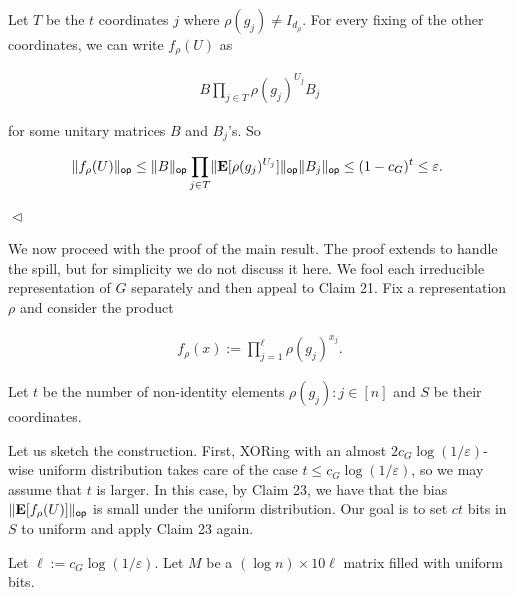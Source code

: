 \documentclass[10pt,a4paper]{article}
\begin{document}
Let $T$ be the $t$ coordinates $j$ where $\rho(g_{j})\neq I_{d_{\rho}}$.
For every fixing of the other coordinates, we can write $f_{\rho}(U)$ as\par


\[\begin{gathered}
B\prod_{j\in T}\rho(g_{j})^{U_{j}}B_{j}
\end{gathered}\]


for some unitary matrices $B$ and $B_{j}$’s.
So\par


\[\begin{gathered}
\lVert f_{\rho}(U)\rVert_{\mathsf{op}}\leq\lVert B\rVert_{\mathsf{op}}\prod_{j\in T}\lVert\mathop{\bf E\/}[\rho(g_{j})^{U_{j}}]\rVert_{\mathsf{op}}\lVert B_{j}\rVert_{\mathsf{op}}\leq(1-c_{G})^{t}\leq\varepsilon.\
\end{gathered}\]


$\vartriangleleft$\par




We now proceed with the proof of the main result. The proof extends to handle the spill, but for simplicity we do not discuss it here. We fool each irreducible representation of $G$ separately and then appeal to Claim 21.
Fix a representation $\rho$ and consider the product\par


\[\begin{gathered}
f_{\rho}(x):=\prod_{j=1}^{\ell}\rho(g_{j})^{x_{j}}.
\end{gathered}\]


Let $t$ be the number of non-identity elements $\rho(g_{j}):j\in[n]$ and $S$ be their coordinates.\par




Let us sketch the construction.
First, XORing with an almost $2c_{G}\log(1/\varepsilon)$-wise uniform distribution takes care of the case $t\leq c_{G}\log(1/\varepsilon)$, so we may assume that $t$ is larger.
In this case, by Claim 23, we have that the bias $\lVert\mathop{\bf E\/}[f_{\rho}(U)]\rVert_{\mathsf{op}}$ is small under the uniform distribution.
Our goal is to set $ct$ bits in $S$ to uniform and apply Claim 23 again.\par




Let $\ell:=c_{G}\log(1/\varepsilon)$.
Let $M$ be a $(\log n)\times 10\ell$ matrix filled with uniform bits.\par
\end{document}
